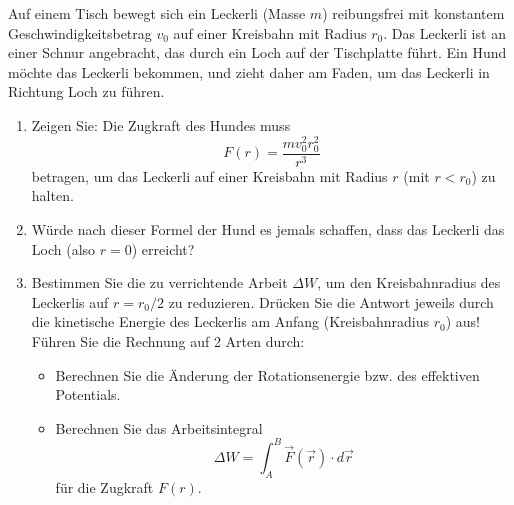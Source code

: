 \begin{ExerciseBlock}
Auf einem Tisch bewegt sich ein Leckerli (Masse $m$) reibungsfrei mit konstantem Geschwindigkeitsbetrag $v_0$ auf einer Kreisbahn mit Radius $r_0$. Das Leckerli ist an einer Schnur angebracht, das durch ein Loch auf der Tischplatte führt. Ein Hund möchte das Leckerli bekommen, und zieht daher am Faden, um das Leckerli in Richtung Loch zu führen.

\begin{center}
\end{center}

\begin{enumerate}
	\item Zeigen Sie: Die Zugkraft des Hundes muss
\[ F(r) = \frac{m v_0^2 r_0^2}{r^3} \]
betragen, um das Leckerli auf einer Kreisbahn mit Radius $r$ (mit $r < r_0$) zu halten.

	\item Würde nach dieser Formel der Hund es jemals schaffen, dass das Leckerli das Loch (also
$r = 0$) erreicht?

	\item Bestimmen Sie die zu verrichtende Arbeit $\Delta W$, um den Kreisbahnradius des Leckerlis auf $r=r_0/2$ zu reduzieren. Drücken Sie die Antwort jeweils durch die kinetische Energie des Leckerlis am Anfang (Kreisbahnradius $r_0$) aus! \\
	Führen Sie die Rechnung auf 2 Arten durch:
	\begin{itemize}
		\item Berechnen Sie die Änderung der Rotationsenergie bzw. des effektiven Potentials.
		\item Berechnen Sie das Arbeitsintegral \[ \Delta W = \int_{A}^{B} \vec{F}(\vec{r}) \cdot d\vec{r} \] für die Zugkraft $F(r)$.
	\end{itemize}

\end{enumerate}
\end{ExerciseBlock}
